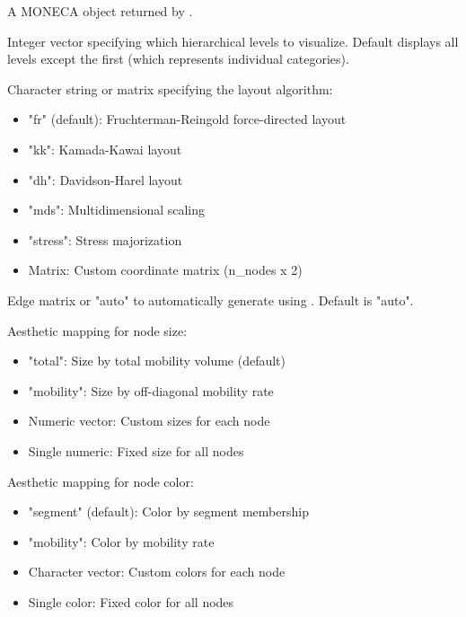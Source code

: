 \documentclass[a4paper]{book}
\begin{document}
\begin{Arguments}
\begin{ldescription}
\item[\code{segments}] A MONECA object returned by .

\item[\code{level}] Integer vector specifying which hierarchical levels to visualize.
Default displays all levels except the first (which represents individual categories).

\item[\code{layout}] Character string or matrix specifying the layout algorithm:
\begin{itemize}

\item{} "fr" (default): Fruchterman-Reingold force-directed layout
\item{} "kk": Kamada-Kawai layout
\item{} "dh": Davidson-Harel layout  
\item{} "mds": Multidimensional scaling
\item{} "stress": Stress majorization
\item{} Matrix: Custom coordinate matrix (n\_nodes x 2)

\end{itemize}


\item[\code{edges}] Edge matrix or "auto" to automatically generate using 
. Default is "auto".

\item[\code{node\_size}] Aesthetic mapping for node size:
\begin{itemize}

\item{} "total": Size by total mobility volume (default)
\item{} "mobility": Size by off-diagonal mobility rate
\item{} Numeric vector: Custom sizes for each node
\item{} Single numeric: Fixed size for all nodes

\end{itemize}


\item[\code{node\_color}] Aesthetic mapping for node color:
\begin{itemize}

\item{} "segment" (default): Color by segment membership
\item{} "mobility": Color by mobility rate
\item{} Character vector: Custom colors for each node
\item{} Single color: Fixed color for all nodes


\end{itemize}
\end{ldescription}
\end{Arguments}
\end{document}
